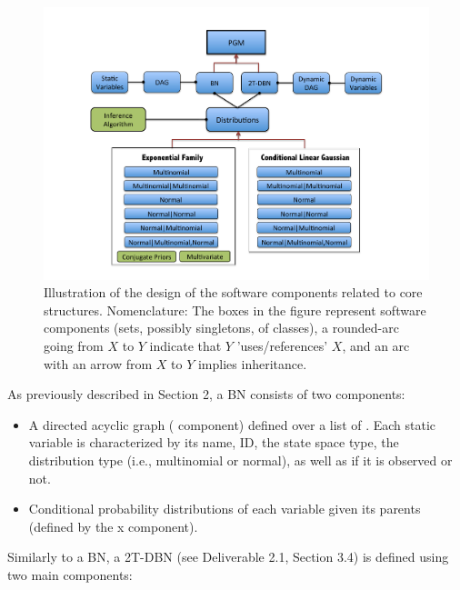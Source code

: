\begin{figure}[htbp]
\begin{center}
\includegraphics[width=\linewidth]{./figures/ToolboxBasicStructures}
\caption{\label{Figure:ToolboxBasicStructure} Illustration of the design of the software components related to
  core structures. Nomenclature: The boxes in the
      figure represent software components (sets, possibly singletons, of classes), a rounded-arc going from $X$
      to $Y$ indicate that $Y$ 'uses/references' $X$, and an arc with an arrow from $X$ to $Y$ implies
      inheritance.}
\end{center}
\end{figure}

As previously described in Section 2, a BN consists of two components:

\begin{itemize}
  \item A directed acyclic graph ( component) defined over a list of . Each static variable is characterized by its name, ID, the state space type, the distribution type (i.e., multinomial or normal), as well as if it is observed or not.

  \item Conditional probability distributions of each variable given its parents (defined by the x component).
\end{itemize}

Similarly to a BN, a 2T-DBN (see Deliverable 2.1, Section 3.4) is defined using two main components:



